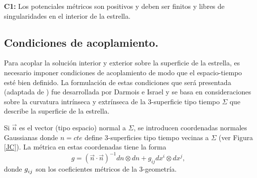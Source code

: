 \textbf{C1:} Los potenciales métricos son positivos y deben ser finitos y libres de singularidades en el interior de la estrella.
\subsection*{Condiciones de acoplamiento.}
\noindent Para acoplar la solución interior y exterior sobre la superficie de la estrella, es necesario imponer condiciones de acoplamiento de modo que el espacio-tiempo esté bien definido. 
La formulación de estas condiciones que será presentada (adaptada de \cite{Misner1973}) fue desarrollada por Darmois \cite{Darmois1927} e Israel \cite{Israel1966} y se basa en consideraciones sobre la curvatura intrínseca y extrínseca de la 3-superficie tipo tiempo $\Sigma$ que describe la superficie de la estrella.
 
 Si $\vec{n}$ es el vector (tipo espacio) normal a $\Sigma$, se introducen coordenadas normales Gaussianas donde $n=cte$ define 3-superficies tipo tiempo vecinas a $\Sigma$ (ver Figura \ref{JC}). La métrica en estas coordenadas tiene la forma 
 \begin{equation}
g=(\vec{n} \cdot \vec{n})^{-1} d n\otimes d n +g_{i j} d x^{i} \otimes d x^{j},
\end{equation}
donde $\tensor{g}{_i_j}$ son los coeficientes métricos de la 3-geometría.  

